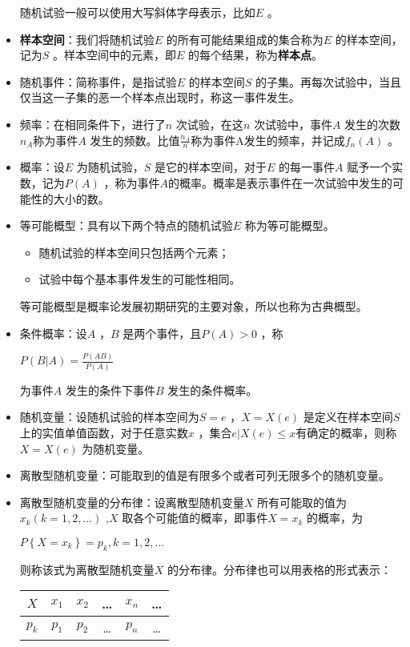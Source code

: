 \documentclass[11pt]{book}
\begin{document}
\begin{itemize}
	随机试验一般可以使用大写斜体字母表示，比如$ E $ 。
		\item \textbf{样本空间}：我们将随机试验$ E $ 的所有可能结果组成的集合称为$ E $ 的样本空间，记为$ S $  。样本空间中的元素，即$ E $ 的每个结果，称为\textbf{样本点}。
		\item 随机事件：简称事件，是指试验$ E$ 的样本空间$ S$ 的子集。再每次试验中，当且仅当这一子集的恶一个样本点出现时，称这一事件发生。
		\item 频率：在相同条件下，进行了$ n $ 次试验，在这$ n $ 次试验中，事件$ A $ 发生的次数$ n_A $称为事件$ A $ 发生的频数。比值$ \frac{n_A}{n} $称为事件A发生的频率，并记成$ f_n (A) $ 。
		\item 概率：设$ E $ 为随机试验，$ S $ 是它的样本空间，对于$ E $ 的每一事件$ A $ 赋予一个实数，记为$ P(A) $ ，称为事件$ A $的概率。概率是表示事件在一次试验中发生的可能性的大小的数。
		\item 等可能概型：具有以下两个特点的随机试验$ E $ 称为等可能概型。
		\begin{itemize}
			\item 随机试验的样本空间只包括两个元素；
			\item 试验中每个基本事件发生的可能性相同。
		\end{itemize}
		等可能概型是概率论发展初期研究的主要对象，所以也称为古典概型。
		\item 条件概率：设$ A $ ，$ B $ 是两个事件，且$ P(A)>0 $ ，称
		\begin{center}
			$ P(B|A)=\frac{P(AB)}{P(A)} $
		\end{center}
		为事件$ A $ 发生的条件下事件$ B $ 发生的条件概率。
		\item 随机变量：设随机试验的样本空间为$ S={e}$ ，$ X=X(e)$ 是定义在样本空间$ S $上的实值单值函数，对于任意实数$ x$ ，集合$ {e|X(e)\le x}$有确定的概率，则称$ X=X(e)$ 为随机变量。
		\item 离散型随机变量：可能取到的值是有限多个或者可列无限多个的随机变量。
		\item 离散型随机变量的分布律：设离散型随机变量$ X $ 所有可能取的值为$ x_k(k=1, 2, \dots)$ ,$ X $ 取各个可能值的概率，即事件$ {X=x_k} $ 的概率，为
		\begin{center}
			$ P\left\{X=x_k\right\}=p_k, k=1, 2, \dots $
		\end{center}
		则称该式为离散型随机变量$ X $ 的分布律。分布律也可以用表格的形式表示：
		\begin{center}
			\begin{tabular}{|c|c|c|c|c|c|}
				\hline
				$ X $ & $ x_1 $ & $ x_2 $ & \dots & $ x_n $ & \dots \\
				\hline 
				$ p_k $ & $ p_1 $ & $ p_2 $ & \dots & $ p_n $ & \dots \\
				\hline
			\end{tabular}
		\end{center}
	\end{itemize}
\end{document}
